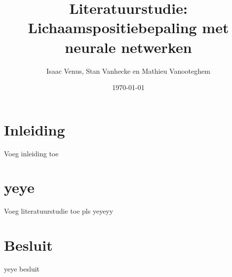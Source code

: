 \documentclass[a4paper,kulak]{kulakarticle} %
\date{\today}
\title{Literatuurstudie: Lichaamspositiebepaling met neurale netwerken}
\author{Isaac Venus, Stan Vanhecke en Mathieu Vanooteghem}
\begin{document}
\maketitle

\section*{Inleiding}
Voeg inleiding toe
\section{yeye}
Voeg literatuurstudie toe pls yeyeyy
\section*{Besluit}
yeye besluit
\end{document}
